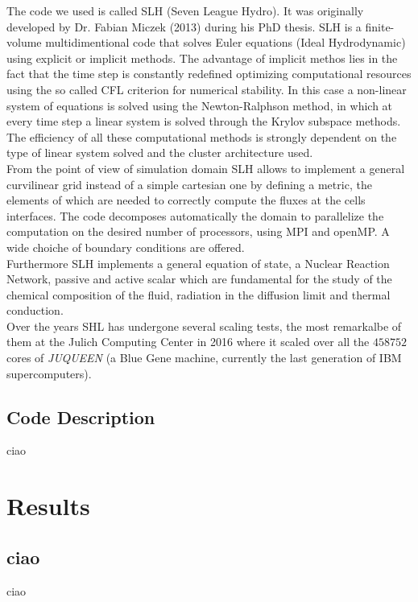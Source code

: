 \documentclass[11pt]{article}
\numberwithin{equation}{section}
\begin{document}
The code we used is called SLH (Seven League Hydro). It was originally developed by Dr. Fabian Miczek (2013) during his PhD thesis. SLH is a finite-volume multidimentional code that solves Euler equations (Ideal Hydrodynamic) using explicit or implicit methods. The advantage of implicit methos lies in the fact that the time step is constantly redefined optimizing computational resources using the so called CFL criterion for numerical stability. In this case a non-linear system of equations is solved using the Newton-Ralphson method, in which at every time step a linear system is solved through the Krylov subspace methods. The efficiency of all these computational methods is strongly dependent on the type of linear system solved and the cluster architecture used. \\
From the point of view of simulation domain SLH allows to implement a general curvilinear grid instead of a simple cartesian one by defining a metric, the elements of which are needed to correctly compute the fluxes at the cells interfaces. The code decomposes automatically the domain to parallelize the computation on the desired number of processors, using MPI and openMP. A wide choiche of boundary conditions are offered. \\
Furthermore SLH implements a general equation of state, a Nuclear Reaction Network, passive and active scalar which are fundamental for the study of the chemical composition of the fluid, radiation in the diffusion limit and thermal conduction. \\
Over the years SHL has undergone several scaling tests, the most remarkalbe of them at the Julich Computing Center in 2016 where it scaled over all the $458752$ cores of \textit{JUQUEEN} (a Blue Gene machine, currently the last generation of IBM supercomputers).
\subsection{Code Description}
ciao


\section{Results}
\subsection{ciao}
ciao
\end{document}
